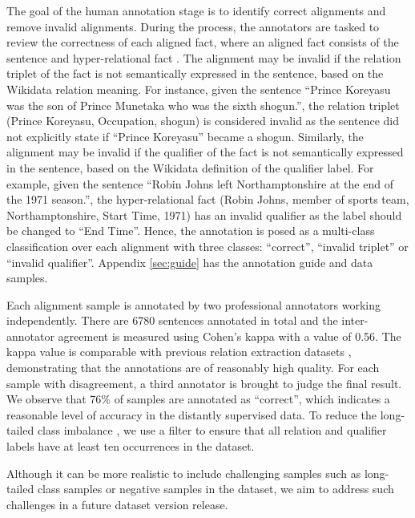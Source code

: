 \documentclass[11pt]{article}
\newcommand{\flag}[1]{#1}
\begin{document}
The goal of the human annotation stage is to identify correct alignments and remove invalid alignments.
During the process, the annotators are tasked to review the correctness of each aligned fact, where an aligned fact consists of the sentence  and hyper-relational fact .
The alignment may be invalid if the relation triplet of the fact is not semantically expressed in the sentence, based on the Wikidata relation meaning.
For instance, given the sentence ``Prince Koreyasu was the son of Prince Munetaka who was the sixth shogun.'', the relation triplet (Prince Koreyasu, Occupation, shogun) is considered invalid as the sentence did not explicitly state if ``Prince Koreyasu'' became a shogun.
Similarly, the alignment may be invalid if the qualifier of the fact is not semantically expressed in the sentence, based on the Wikidata definition of the qualifier label.
For example, given the sentence ``Robin Johns left Northamptonshire at the end of the 1971 season.'', the hyper-relational fact (Robin Johns, member of sports team, Northamptonshire, Start Time, 1971) has an invalid qualifier as the label should be changed to ``End Time''.
Hence, the annotation is posed as a multi-class classification over each alignment with three classes: ``correct'', ``invalid triplet'' or ``invalid qualifier''.
Appendix \ref{sec:guide} has the annotation guide and data samples.


Each alignment sample is annotated by two professional annotators working independently.
There are 6780 sentences annotated in total and the inter-annotator agreement is measured using Cohen's kappa with a value of 0.56.
The kappa value is comparable with previous relation extraction datasets \citep{zhang-etal-2017-position}, demonstrating that the annotations are of reasonably high quality.
For each sample with disagreement, a third annotator is brought to judge the final result. 
We observe that 76\% of samples are annotated as ``correct'', which indicates a reasonable level of accuracy in the distantly supervised data.
To reduce the long-tailed class imbalance \citep{zhang-etal-2019-long}, we use a filter to ensure that all relation and qualifier labels have at least ten occurrences in the dataset.
\flag{
Although it can be more realistic to include challenging samples such as long-tailed class samples or negative samples in the dataset, we aim to address such challenges in a future dataset version release.
}
\end{document}
